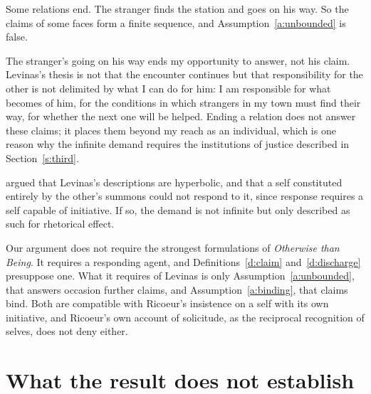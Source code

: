 \documentclass{situationist-preprint}
\begin{document}
\begin{objection}
Some relations end. The stranger finds the station and goes on his way. So the claims of some faces form a finite sequence, and Assumption~\ref{a:unbounded} is false.
\end{objection}

\begin{reply}
The stranger's going on his way ends my opportunity to answer, not his claim. Levinas's thesis is not that the encounter continues but that responsibility for the other is not delimited by what I can do for him: I am responsible for what becomes of him, for the conditions in which strangers in my town must find their way, for whether the next one will be helped. Ending a relation does not answer these claims; it places them beyond my reach as an individual, which is one reason why the infinite demand requires the institutions of justice described in Section~\ref{s:third}.
\end{reply}

\begin{objection}
\citet{Ricoeur1990} argued that Levinas's descriptions are hyperbolic, and that a self constituted entirely by the other's summons could not respond to it, since response requires a self capable of initiative. If so, the demand is not infinite but only described as such for rhetorical effect.
\end{objection}

\begin{reply}
Our argument does not require the strongest formulations of \emph{Otherwise than Being}. It requires a responding agent, and Definitions~\ref{d:claim} and~\ref{d:discharge} presuppose one. What it requires of Levinas is only Assumption~\ref{a:unbounded}, that answers occasion further claims, and Assumption~\ref{a:binding}, that claims bind. Both are compatible with Ricoeur's insistence on a self with its own initiative, and Ricoeur's own account of solicitude, as the reciprocal recognition of selves, does not deny either.
\end{reply}

\section{What the result does not establish}
\end{document}
